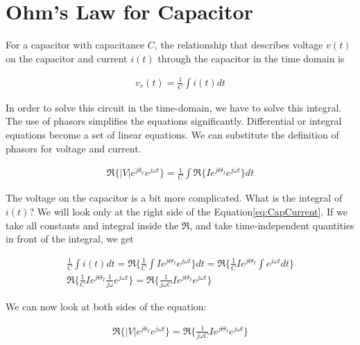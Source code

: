 \documentclass{ximera}
\begin{document}
\section{Ohm's Law for Capacitor}

 

For a  capacitor with capacitance $C$, the relationship that describes voltage $v(t)$ on the capacitor and  current $i(t)$ through the capacitor in the time domain is



\begin{eqnarray}
v_s(t) =  \frac{1}{C} \int i(t) dt \label{eq:capTD}
\end{eqnarray} 


In order to solve this circuit in the time-domain, we have to solve this integral.
The use of phasors simplifies the equations
significantly. Differential or integral equations become a set of
linear equations. We can substitute the definition of phasors for voltage and current.




\begin{eqnarray}
 \Re\{|V|e^{j\theta_{V}} e^{j \omega t}\} =  \frac{1}{C} \int \Re\{I e^{j \Theta_I} e^{j \omega t}\}  dt \label{eq:CapCurrent}
\end{eqnarray} 


The voltage on the capacitor is a bit more complicated. What is the integral of $i(t)$? We will look only at the right side of the Equation\ref{eq:CapCurrent}. If we take all constants and integral inside the $\Re$,  and   take  time-independent quantities in front of the integral, we get




\begin{eqnarray}
 \frac{1}{C} \int i(t) dt  =  \Re\{   \frac{1}{C} \int I e^{j \Theta_I} e^{j \omega t}\}  dt  = \Re\{   \frac{1}{C}  I e^{j \Theta_I} \int e^{j \omega t}dt \}    \\
 \Re\{   \frac{1}{C}  I e^{j \Theta_I} \frac{1}{j \omega} e^{j \omega t}  \}   = \Re\{   \frac{1}{j \omega C}  I e^{j \Theta_I}  e^{j \omega t}  \}  
\end{eqnarray} 



We can now look at both sides of the equation: 


\begin{eqnarray}
 \Re\{|V|e^{j\theta_{V}} e^{j \omega t}\} =  \Re\{   \frac{1}{j \omega C}  I e^{j \Theta_I}  e^{j \omega t}  \}  \label{eq:CapCurrent1}
\end{eqnarray} 
\end{document}
